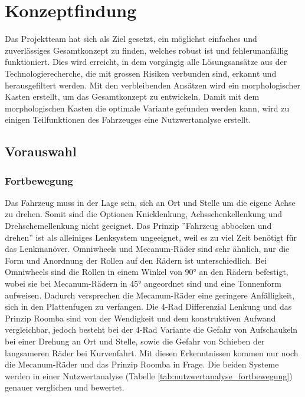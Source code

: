 \documentclass[../main.tex]{subfiles}
\begin{document}
\newpage
\section{Konzeptfindung}
\label{a3:Konzeptfindung}

Das Projektteam hat sich als Ziel gesetzt, ein möglichst einfaches und zuverlässiges Gesamtkonzept zu finden, welches robust ist und fehlerunanfällig funktioniert. Dies wird erreicht, in dem vorgängig alle Lösungsansätze aus der Technologierecherche, die mit grossen Risiken verbunden sind, erkannt und herausgefiltert werden. Mit den verbleibenden Ansätzen wird ein morphologischer Kasten erstellt, um das Gesamtkonzept zu entwickeln. Damit mit dem morphologischen Kasten die optimale Variante gefunden werden kann, wird zu einigen Teilfunktionen des Fahrzeuges eine Nutzwertanalyse erstellt.

\subsection{Vorauswahl}
\label{a3:Vorauswahl}
    \subsubsection{Fortbewegung}
    Das Fahrzeug muss in der Lage sein, sich an Ort und Stelle um die eigene Achse zu drehen. Somit sind die Optionen Knicklenkung, Achsschenkellenkung und Drehschemellenkung nicht geeignet.
    Das Prinzip ''Fahrzeug abbocken und drehen'' ist als alleiniges Lenksystem ungeeignet, weil es zu viel Zeit benötigt für das Lenkmanöver. 
    Omniwheels und Mecanum-Räder sind sehr ähnlich, nur die Form und Anordnung der Rollen auf den Rädern ist unterschiedlich. Bei Omniwheels sind die Rollen in einem Winkel von 90° an den Rädern befestigt, wobei sie bei Mecanum-Rädern in 45° angeordnet sind und eine Tonnenform aufweisen. Dadurch versprechen die Mecanum-Räder eine geringere Anfälligkeit, sich in den Plattenfugen zu verfangen. Die 4-Rad Differenzial Lenkung und das Prinzip Roomba sind von der Wendigkeit und dem konstruktiven Aufwand vergleichbar, jedoch besteht bei der 4-Rad Variante die Gefahr von Aufschaukeln bei einer Drehung an Ort und Stelle, sowie die Gefahr von Schieben der langsameren Räder bei Kurvenfahrt. Mit diesen Erkenntnissen kommen nur noch die Mecanum-Räder und das Prinzip Roomba in Frage. Die beiden Systeme werden in einer Nutzwertanalyse (Tabelle \ref{tab:nutzwertanalyse_fortbewegung}) genauer verglichen und bewertet.
        
\newpage
\end{document}
